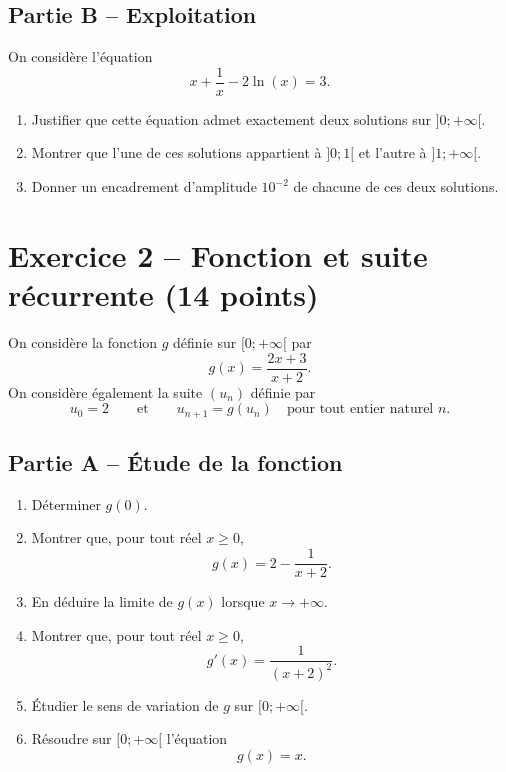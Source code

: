 \documentclass[11pt,a4paper]{article}
\begin{document}
\subsection*{Partie B -- Exploitation}
On considère l'équation
\[
x+\frac{1}{x}-2\ln(x)=3.
\]

\begin{enumerate}[label=\textbf{\arabic*.}, start=6, leftmargin=1.1cm]
    \item Justifier que cette équation admet exactement deux solutions sur \( ]0;+\infty[ \).
    \item Montrer que l'une de ces solutions appartient à \( ]0;1[ \) et l'autre à \( ]1;+\infty[ \).
    \item Donner un encadrement d'amplitude \(10^{-2}\) de chacune de ces deux solutions.
\end{enumerate}

\vspace{0.5em}

\section*{Exercice 2 -- Fonction et suite récurrente \hfill \textnormal{(14 points)}}

On considère la fonction \( g \) définie sur \( [0;+\infty[ \) par
\[
g(x)=\frac{2x+3}{x+2}.
\]
On considère également la suite \( (u_n) \) définie par
\[
u_0=2
\qquad \text{et} \qquad
u_{n+1}=g(u_n)
\quad \text{pour tout entier naturel } n.
\]

\subsection*{Partie A -- Étude de la fonction}
\begin{enumerate}[label=\textbf{\arabic*.}, leftmargin=1.1cm]
    \item Déterminer \( g(0) \).
    \item Montrer que, pour tout réel \( x\ge 0 \),
    \[
    g(x)=2-\frac{1}{x+2}.
    \]
    \item En déduire la limite de \( g(x) \) lorsque \( x\to +\infty \).
    \item Montrer que, pour tout réel \( x\ge 0 \),
    \[
    g'(x)=\frac{1}{(x+2)^2}.
    \]
    \item Étudier le sens de variation de \( g \) sur \( [0;+\infty[ \).
    \item Résoudre sur \( [0;+\infty[ \) l'équation
    \[
    g(x)=x.
    \]
\end{enumerate}
\end{document}
